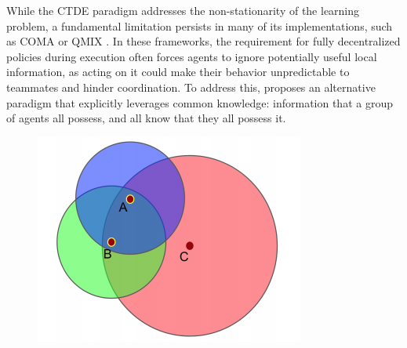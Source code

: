 While the CTDE paradigm addresses the non-stationarity of the learning problem, a fundamental limitation persists in many of its implementations, such as COMA \parencite{COMA} or QMIX \parencite{QMIX}. In these frameworks, the requirement for fully decentralized policies during execution often forces agents to ignore potentially useful local information, as acting on it could make their behavior unpredictable to teammates and hinder coordination. To address this, \parencite{mackrl} proposes an alternative paradigm that explicitly leverages common knowledge: information that a group of agents all possess, and all know that they all possess it.


\begin{figure}[h!]
    \begin{minipage}{0.55\textwidth}
       \includegraphics[width=\linewidth]{img_pfe/agent_fov.png}
    \end{minipage}
    \hfill
    \begin{minipage}{0.4\textwidth}

        \label{fig:agents_fov}
    \end{minipage}

\end{figure}


